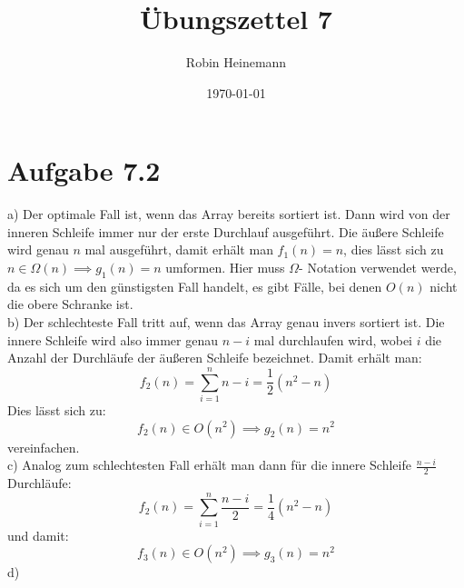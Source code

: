 \documentclass[a4paper]{scrartcl}
\author{Robin Heinemann}
\date{\today}
\title{Übungszettel 7}
\begin{document}
\maketitle
\section*{Aufgabe 7.2}
a) Der optimale Fall ist, wenn das Array bereits sortiert ist. Dann wird von der inneren Schleife immer
   nur der erste Durchlauf ausgeführt. Die äußere Schleife wird genau $n$ mal ausgeführt, damit erhält
   man $f_1(n) = n$, dies lässt sich zu $n \in \Omega(n) \implies g_1(n) = n$ umformen. Hier muss $\Omega$-
   Notation verwendet werde, da es sich um den günstigsten Fall handelt, es gibt Fälle, bei denen $O(n)$
   nicht die obere Schranke ist. \\
b) Der schlechteste Fall tritt auf, wenn das Array genau invers sortiert ist. Die innere Schleife wird also
   immer genau $n - i$ mal durchlaufen wird, wobei $i$ die Anzahl der Durchläufe der äußeren Schleife
   bezeichnet. Damit erhält man:
   \[f_2(n) = \sum_{i = 1}^{n} n - i = \frac{1}{2} (n^2 - n)\]
   Dies lässt sich zu:
   \[f_2(n) \in O(n^2) \implies g_2(n) = n^2\]
   vereinfachen. \\
c) Analog zum schlechtesten Fall erhält man dann für die innere Schleife $\frac{n - i}{2}$ Durchläufe:
   \[f_2(n) = \sum_{i = 1}^{n} \frac{n - i}{2} = \frac{1}{4}(n^2 - n)\]
   und damit:
   \[f_3(n) \in O(n^2) \implies g_3(n) = n^2\]
d)
\end{document}

